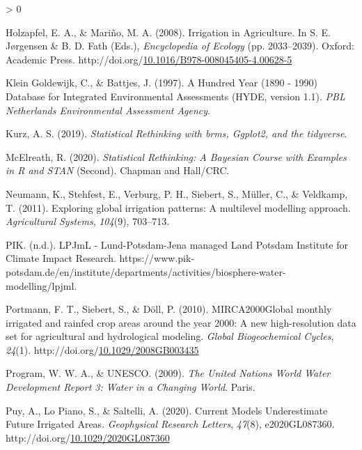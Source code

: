 \documentclass[12pt,twoside]{reedthesis}
\newlength{\cslhangindent}
\newenvironment{CSLReferences}[2] %
 {%
  \setlength{\parindent}{0pt}
  \ifodd #1 \everypar{\setlength{\hangindent}{\cslhangindent}}\ignorespaces\fi
  \ifnum #2 > 0
  \setlength{\parskip}{#2\baselineskip}
  \fi
 }%
 {}
\begin{document}
\begin{CSLReferences}{1}{0}
\leavevmode\hypertarget{ref-holzapfelIrrigationAgriculture2008}{}%
Holzapfel, E. A., \& Mariño, M. A. (2008). Irrigation in {Agriculture}. In S. E. Jørgensen \& B. D. Fath (Eds.), \emph{Encyclopedia of {Ecology}} (pp. 2033--2039). {Oxford}: {Academic Press}. http://doi.org/\href{https://doi.org/10.1016/B978-008045405-4.00628-5}{10.1016/B978-008045405-4.00628-5}

\leavevmode\hypertarget{ref-kleingoldewijkHundredYear18901997}{}%
Klein Goldewijk, C., \& Battjes, J. (1997). A {Hundred Year} (1890 - 1990) {Database} for {Integrated Environmental Assessments} ({HYDE}, version 1.1). \emph{PBL Netherlands Environmental Assessment Agency}.

\leavevmode\hypertarget{ref-kurzStatisticalRethinkingBrms2019}{}%
Kurz, A. S. (2019). \emph{Statistical {Rethinking} with brms, Ggplot2, and the tidyverse}.

\leavevmode\hypertarget{ref-mcelreathStatisticalRethinkingBayesian2020}{}%
McElreath, R. (2020). \emph{Statistical {Rethinking}: A {Bayesian Course} with {Examples} in {R} and {STAN}} (Second). {Chapman and Hall/CRC}.

\leavevmode\hypertarget{ref-neumannExploringGlobalIrrigation2011}{}%
Neumann, K., Stehfest, E., Verburg, P. H., Siebert, S., Müller, C., \& Veldkamp, T. (2011). Exploring global irrigation patterns: A multilevel modelling approach. \emph{Agricultural Systems}, \emph{104}(9), 703--713.

\leavevmode\hypertarget{ref-pikLPJmLLundPotsdamJenaManaged}{}%
PIK. (n.d.). {LPJmL} - {Lund}-{Potsdam}-{Jena} managed {Land} {} {Potsdam Institute} for {Climate Impact Research}. https://www.pik-potsdam.de/en/institute/departments/activities/biosphere-water-modelling/lpjml.

\leavevmode\hypertarget{ref-portmannMIRCA2000GlobalMonthly2010a}{}%
Portmann, F. T., Siebert, S., \& Döll, P. (2010). {MIRCA2000}{{Global}} monthly irrigated and rainfed crop areas around the year 2000: A new high-resolution data set for agricultural and hydrological modeling. \emph{Global Biogeochemical Cycles}, \emph{24}(1). http://doi.org/\href{https://doi.org/10.1029/2008GB003435}{10.1029/2008GB003435}

\leavevmode\hypertarget{ref-worldwaterassesnentprogramUnitedNationsWorld2009}{}%
Program, W. W. A., \& UNESCO. (2009). \emph{The {United Nations World Water Development Report} 3: Water in a {Changing World}}. {Paris}.

\leavevmode\hypertarget{ref-puyCurrentModelsUnderestimate2020}{}%
Puy, A., Lo Piano, S., \& Saltelli, A. (2020). Current {Models Underestimate Future Irrigated Areas}. \emph{Geophysical Research Letters}, \emph{47}(8), e2020GL087360. http://doi.org/\href{https://doi.org/10.1029/2020GL087360}{10.1029/2020GL087360}


\end{CSLReferences}
\end{document}
